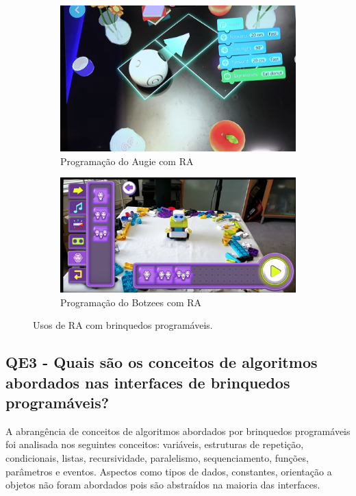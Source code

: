 {\begin{figure}[!htbp]
    \centering
    \begin{subfigure}{.44\textwidth}
        \centering
        \includegraphics[width=.9\linewidth,fbox]{figs/augie_ar_programming_2.png}
        \caption{Programação do Augie com RA}
        \label{augie_ar_programming}
    \end{subfigure}%
    \begin{subfigure}{.55\textwidth}
        \centering
        \includegraphics[width=.9\linewidth,fbox]{figs/botzees.png}
        \caption{Programação do Botzees com RA}
        \label{botzees_ar_programming}
    \end{subfigure}
    \caption{Usos de RA com brinquedos programáveis.}
    \label{ar_programming}
\end{figure}

\subsection{QE3 - Quais são os conceitos de algoritmos abordados nas interfaces de brinquedos programáveis?}

A abrangência de conceitos de algoritmos abordados por brinquedos programáveis foi analisada nos seguintes conceitos: variáveis, estruturas de repetição, condicionais, listas, recursividade, paralelismo, sequenciamento, funções, parâmetros e eventos. Aspectos como tipos de dados, constantes, orientação a objetos não foram abordados pois são abstraídos na maioria das interfaces.

}

